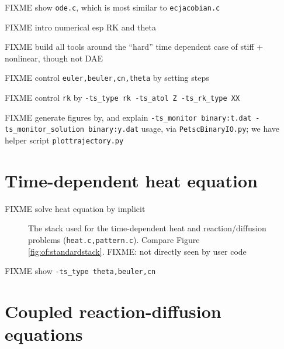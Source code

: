 FIXME show \texttt{ode.c}, which is most similar to \texttt{ecjacobian.c}

FIXME intro numerical esp RK and theta \citep{AscherPetzold1998}

FIXME build all tools around the ``hard'' time dependent case of stiff + nonlinear, though not DAE

FIXME control \texttt{euler,beuler,cn,theta} by setting steps

FIXME control \texttt{rk} by \texttt{-ts\_type rk -ts\_atol Z -ts\_rk\_type XX}

FIXME generate figures by, and explain \texttt{-ts\_monitor binary:t.dat -ts\_monitor\_solution binary:y.dat} usage, via \texttt{PetscBinaryIO.py}; we have helper script \texttt{plottrajectory.py}


\section{Time-dependent heat equation}

FIXME solve heat equation by implicit






\begin{figure}
\caption{The \PETSc stack used for the time-dependent heat and reaction/diffusion problems (\texttt{heat.c,pattern.c}).  Compare Figure \ref{fig:of:standardstack}.  FIXME: \pSNES not directly seen by user code}
\label{fig:of:tsstack}
\end{figure}

FIXME show \texttt{-ts\_type theta,beuler,cn}


\section{Coupled reaction-diffusion equations}

